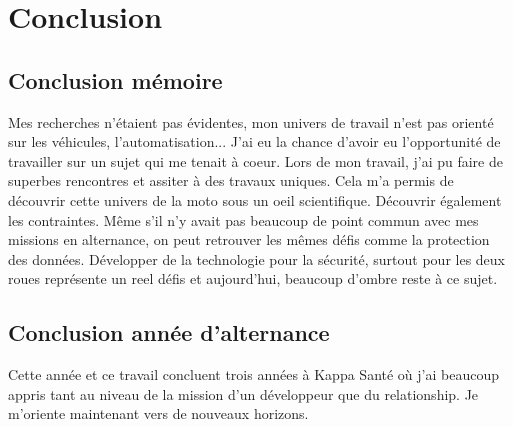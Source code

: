 \section{Conclusion}


\subsection{Conclusion mémoire}
Mes recherches n'étaient pas évidentes, mon univers de travail n'est pas orienté sur les véhicules, l'automatisation... J'ai eu la chance d'avoir eu l'opportunité de travailler sur un sujet qui me tenait à coeur. Lors de mon travail, j'ai pu faire de superbes rencontres et assiter à des travaux uniques. Cela m'a permis de découvrir cette univers de la moto sous un oeil scientifique. Découvrir également les contraintes. Même s'il n'y avait pas beaucoup de point commun avec mes missions en alternance, on peut retrouver les mêmes défis comme la protection des données.
Développer de la technologie pour la sécurité, surtout pour les deux roues représente un reel défis et aujourd’hui, beaucoup d'ombre reste à ce sujet.



\subsection{Conclusion année d'alternance}
Cette année et ce travail concluent trois années à Kappa Santé où j'ai beaucoup appris tant au niveau de la mission d'un développeur que du relationship. 
Je m'oriente maintenant vers de nouveaux horizons.

